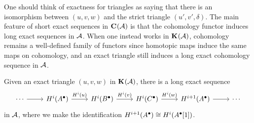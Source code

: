 \iffalse
\begin{example}
  For any complex $\cochaincomp{A}$, the triangle
  \[
    \begin{tikzcd}
      \cochaincomp{A} \arrow[r, "0"]
      & \cochaincomp{A} \arrow[r]
      & \cochaincomp{A} \oplus \cochaincomp{A}[1] \arrow[r]
      & \cochaincomp{A}[1]
    \end{tikzcd}
  \]
  is strict, since $\cone{0} = \cochaincomp{A} \oplus
  \cochaincomp{A}[1]$. The triangle
  \[
    \begin{tikzcd}
      \cochaincomp{A} \arrow[r, "\id"]
      & \cochaincomp{A} \arrow[r]
      & 0 \arrow[r]
      & \cochaincomp{A}[1]
    \end{tikzcd}
  \]
  is exact.

  To see why, note that $\cone{\id}$ is split exact, and so the
  identity map for $\cone{\id}$ is null-homotopic, which in turn
  implies that $\cone{\id} \to \cochaincomp{0}$ is a chain homotopy equivalence.
  This is precisely an isomorphism in $\homcat{\abcat{A}}$, and by
  replacing $\cone{\id}$ by an arbitrary split exact complex
  $\cochaincomp{B}$, we recover the slightly more general fact that
  $\cochaincomp{B} \cong \cochaincomp{0}$ in $\homcat{\abcat{A}}$.
\end{example}
\fi

One should think of exactness for triangles as saying that there is
an isomorphism between $(u, v, w)$ and the strict triangle $(u', v', \delta)$.
The main feature of short exact sequences in ${\mathbf{C}}^{{}}({\mathcal{A}})$ is that
the cohomology functor induces long exact sequences in $\mathcal{A}$.
When one instead works in $\homcat{\abcat{A}}$, cohomology remains a
well-defined family of functors since homotopic maps induce the same
maps on cohomology, and an exact triangle still induces a long exact
cohomology sequence in $\mathcal{A}$.

\begin{proposition}
  \label{prop_homcat_long_exact_coh_seq}
  Given an exact triangle $(u, v, w)$ in $\homcat{\abcat{A}}$, there
  is a long exact sequence
  \[
    \begin{tikzcd}
      \cdots \arrow[r]
      & H^i(\cochaincomp{A}) \arrow[r, "H^i(u)"]
      & H^i(\cochaincomp{B}) \arrow[r, "H^i(v)"]
      & H^i(\cochaincomp{C}) \arrow[r, "H^i(w)"]
      & H^{i + 1}(\cochaincomp{A}) \arrow[r]
      & \cdots
    \end{tikzcd}
  \]
  in $\mathcal{A}$, where we make the identification $H^{i +
  1}({{A}}^{\bullet}) \cong H^i({{A}}^{\bullet}[1])$.
\end{proposition}


